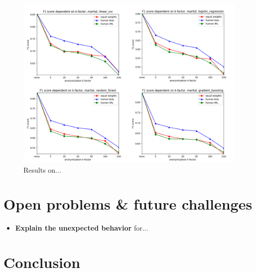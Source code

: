 \documentclass{llncs}
\begin{document}
\begin{figure}[!h]
	\begin{center}
		\vspace{-1.0cm}
		\hspace*{-0.8cm}
		\includegraphics[width=1.0\textwidth]{figures/marital_status.png}
		\caption{Results on...}
		\label{fig:results_marital}
	\end{center}
\end{figure}



\section{Open problems \& future challenges}
\label{sect:op_fc}

\begin{itemize}
	\item \textbf{Explain the unexpected behavior} for...
\end{itemize}


\section{Conclusion}
\label{sect:conclusion}


\clearpage
\newpage



\end{document}
